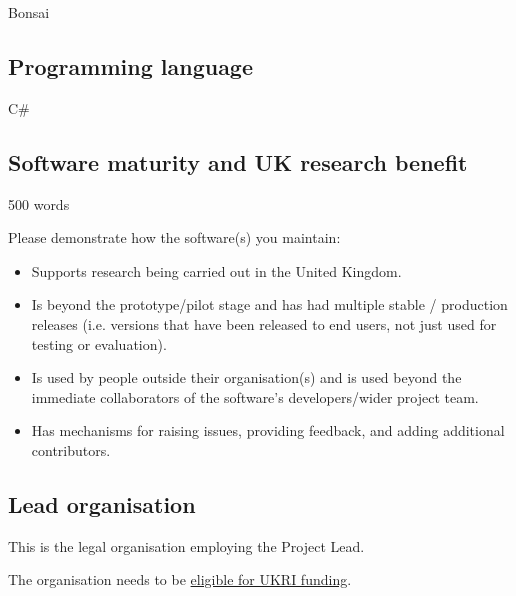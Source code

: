\documentclass[12pt]{article}
\newenvironment{instruction}{%
    \begin{tcolorbox}[breakable,colback=red!5,colframe=red,title=Instruction]%
	}{%
    	\end{tcolorbox}%
	}
\begin{document}
Bonsai

\subsection{Programming language}

C\#

\subsection{Software maturity and UK research benefit}

\begin{instruction}

    500 words

    Please demonstrate how the software(s) you maintain:

    \begin{itemize}

        \item Supports research being carried out in the United Kingdom.

        \item Is beyond the prototype/pilot stage and has had multiple stable /
            production releases (i.e. versions that have been released to end
            users, not just used for testing or evaluation).

        \item Is used by people outside their organisation(s) and is used
            beyond the immediate collaborators of the software’s
            developers/wider project team.

        \item Has mechanisms for raising issues, providing feedback, and adding
            additional contributors.

    \end{itemize}

\end{instruction}



\subsection{Lead organisation}

\begin{instruction}
    This is the legal organisation employing the Project Lead.

    The organisation needs to be
    \href{https://www.ukri.org/publications/organisation-eligibility/research-organisations-eligible-for-ukri-funding/}{eligible
    for UKRI funding}.

\end{instruction}
\end{document}

